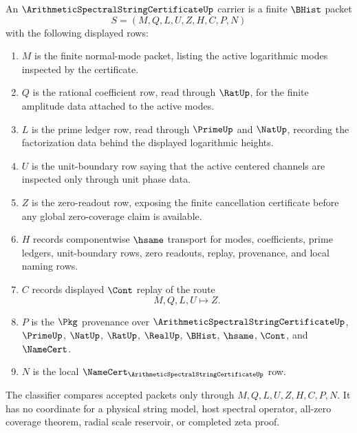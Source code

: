\begin{definition}
\label{def:arithmetic-spectral-string-certificate-carrier}
An $\ArithmeticSpectralStringCertificateUp$ carrier is a finite $\BHist$ packet
$$
S=(M,Q,L,U,Z,H,C,P,N)
$$
with the following displayed rows:
\begin{enumerate}
\item $M$ is the finite normal-mode packet, listing the active logarithmic modes inspected by the certificate.
\item $Q$ is the rational coefficient row, read through $\RatUp$, for the finite amplitude data attached to the active modes.
\item $L$ is the prime ledger row, read through $\PrimeUp$ and $\NatUp$, recording the factorization data behind the displayed logarithmic heights.
\item $U$ is the unit-boundary row saying that the active centered channels are inspected only through unit phase data.
\item $Z$ is the zero-readout row, exposing the finite cancellation certificate before any global zero-coverage claim is available.
\item $H$ records componentwise $\hsame$ transport for modes, coefficients, prime ledgers, unit-boundary rows, zero readouts, replay, provenance, and local naming rows.
\item $C$ records displayed $\Cont$ replay of the route
$$
M,Q,L,U \longmapsto Z .
$$
\item $P$ is the $\Pkg$ provenance over $\ArithmeticSpectralStringCertificateUp$, $\PrimeUp$, $\NatUp$, $\RatUp$, $\RealUp$, $\BHist$, $\hsame$, $\Cont$, and $\NameCert$.
\item $N$ is the local $\NameCert_{\ArithmeticSpectralStringCertificateUp}$ row.
\end{enumerate}
The classifier compares accepted packets only through $M,Q,L,U,Z,H,C,P,N$. It has no coordinate for a physical string model, host spectral operator, all-zero coverage theorem, radial scale reservoir, or completed zeta proof.
\end{definition}

